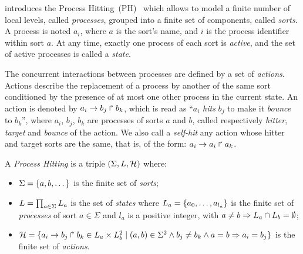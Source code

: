 

 introduces the Process Hitting~(PH)~\cite{PMR10-TCSB}
which allows to model
a finite number of local levels,
called \emph{processes},
grouped into a finite set of components, called \emph{sorts}.
A process is noted $a_i$, where $a$ is the sort's name,
and $i$ is the process identifier within sort $a$.
At any time, exactly one process of each sort is \emph{active},
and the set of active processes is called a \emph{state}.

The concurrent interactions between processes are defined by a set of \emph{actions}.
Actions describe the replacement of a process by another of the same sort
conditioned by the presence of at most one other process in the current state.
An action is denoted by $a_i\rightarrow b_j\Rsh b_k$, which is read as
“$a_i$ \emph{hits} $b_j$ to make it \emph{bounce} to $b_k$”,
where $a_i$, $b_j$, $b_k$ are processes of sorts $a$ and $b$,
called respectively \emph{hitter}, \emph{target} and
\emph{bounce} of the action.
We also call a \emph{self-hit} any action whose hitter and target sorts are the same,
that is, of the form: $a_i\rightarrow a_i\Rsh a_k$.

\begin{definition}\label{def:PH}
  A \emph{Process Hitting} is a triple $(\Sigma,L,\mathcal{H})$ where:
  \begin{itemize}
    \item  $\Sigma = \{a,b,\dots\}$ is the finite set of \emph{sorts};
    \item  $L = \prod_{a\in\Sigma} L_a$ is the set of \emph{states} where
      $L_a = \{a_0,\dots,a_{l_a}\}$
      is the finite set of \emph{processes} of sort $a\in\Sigma$
      and $l_a$ is a positive integer, with $a\neq b\Rightarrow L_a \cap L_b = \emptyset$;
    \item  $\mathcal{H} = \{ a_i\rightarrow b_j\Rsh b_k \in L_a \times L_b^2 \mid
      (a,b) \in \Sigma^2 \wedge b_j\neq b_k \wedge a=b\Rightarrow a_i=b_j\}$
      is the finite set of \emph{actions}.
  \end{itemize}
\end{definition}


